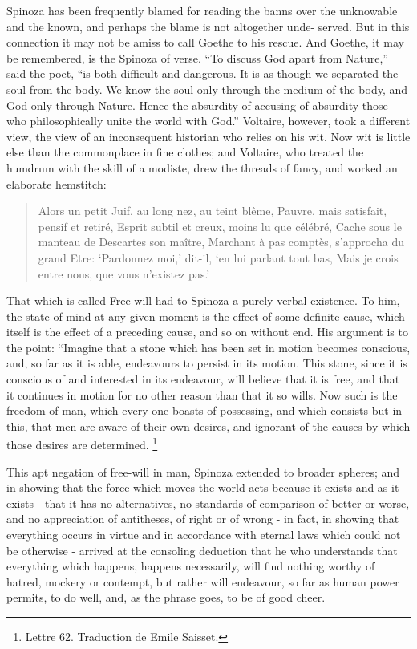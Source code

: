 \documentclass[]{book}
\let\rmarkdownfootnote\footnote%
\def\footnote{\protect\rmarkdownfootnote}
\begin{document}
Spinoza has been frequently blamed for reading the banns over the
unknowable and the known, and perhaps the blame is not altogether unde-
served. But in this connection it may not be amiss to call Goethe to his
rescue. And Goethe, it may be remembered, is the Spinoza of verse. ``To
discuss God apart from Nature,'' said the poet, ``is both difficult and
dangerous. It is as though we separated the soul from the body. We know
the soul only through the medium of the body, and God only through
Nature. Hence the absurdity of accusing of absurdity those who
philosophically unite the world with God.'' Voltaire, however, took a
different view, the view of an inconsequent historian who relies on his
wit. Now wit is little else than the commonplace in fine clothes; and
Voltaire, who treated the humdrum with the skill of a modiste, drew the
threads of fancy, and worked an elaborate hemstitch:

\begin{quote}
Alors un petit Juif, au long nez, au teint blême, Pauvre, mais
satisfait, pensif et retiré, Esprit subtil et creux, moins lu que
célébré, Cache sous le manteau de Descartes son maître, Marchant à pas
comptès, s'approcha du grand Etre: `Pardonnez moi,' dit-il, `en lui
parlant tout bas, Mais je crois entre nous, que vous n'existez pas.'
\end{quote}

That which is called Free-will had to Spinoza a purely verbal existence.
To him, the state of mind at any given moment is the effect of some
definite cause, which itself is the effect of a preceding cause, and so
on without end. His argument is to the point: ``Imagine that a stone
which has been set in motion becomes conscious, and, so far as it is
able, endeavours to persist in its motion. This stone, since it is
conscious of and interested in its endeavour, will believe that it is
free, and that it continues in motion for no other reason than that it
so wills. Now such is the freedom of man, which every one boasts of
possessing, and which consists but in this, that men are aware of their
own desires, and ignorant of the causes by which those desires are
determined. \footnote{Lettre 62. Traduction de Emile Saisset.}

This apt negation of free-will in man, Spinoza extended to broader
spheres; and in showing that the force which moves the world acts
because it exists and as it exists - that it has no alternatives, no
standards of comparison of better or worse, and no appreciation of
antitheses, of right or of wrong - in fact, in showing that everything
occurs in virtue and in accordance with eternal laws which could not be
otherwise - arrived at the consoling deduction that he who understands
that everything which happens, happens necessarily, will find nothing
worthy of hatred, mockery or contempt, but rather will endeavour, so far
as human power permits, to do well, and, as the phrase goes, to be of
good cheer.
\end{document}

